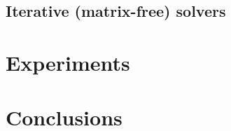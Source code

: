 \subsection{Iterative (matrix-free) solvers}

\section{Experiments}

\clearpage
\section{Conclusions}
\label{sec:conclusions_learning}

\chapterend
